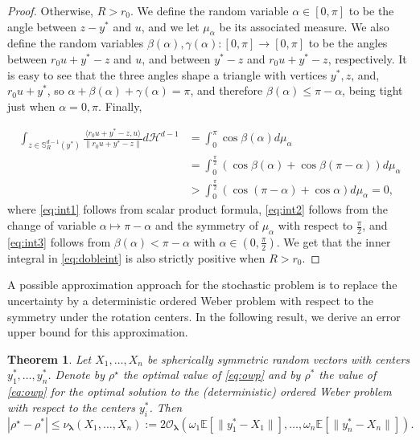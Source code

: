\documentclass[letter,11pt, reqno]{amsart}
\newcommand{\E}{\mathbb{E}}
\newcommand{\HH}{\mathcal{H}}
\renewcommand{\SS}{\mathbb{S}}
\renewcommand{\O}{\mathcal{O}}
\renewcommand{\;}{\quad}
\theoremstyle{thmstyleone}%
\newtheorem{theorem}{Theorem}%
\theoremstyle{thmstyletwo}%
\theoremstyle{thmstylethree}%
\begin{document}
\begin{proof}
    Otherwise, $R>r_0$. We define the random variable $\alpha\in[0, \pi]$ to be the angle between $z-y^*$ and $u$, and we let $\mu_\alpha$ be its associated measure. We also define the random variables $\beta(\alpha), \gamma(\alpha):[0, \pi ]\to [0, \pi ]$ to be the angles between $r_0u+y^* -z$ and $u$, and between $y^*-z$ and $r_0u+y^*-z$, respectively. It is easy to see that the three angles shape a triangle with vertices $y^*, z$, and, $r_0u+y^*$, so $\alpha+\beta(\alpha)+\gamma(\alpha)=\pi$, and therefore $\beta(\alpha)\leq \pi-\alpha$, being tight just when $\alpha=0,\pi$. Finally,

    \begin{align}
        \int_{z\in\SS^{d-1}_R(y^*)}\frac{\langle r_0u+y^*-z, u\rangle}{\|r_0u+y^*-z\|}d\HH^{d-1} & = \int_0^\pi\cos\beta(\alpha)d\mu_\alpha \label{eq:int1}\\
        &= \int_0^{\frac{\pi}{2}}(\cos\beta(\alpha)+\cos\beta(\pi-\alpha) )d\mu_\alpha\label{eq:int2}\\
        & > \int_0^{\frac{\pi}{2}}(\cos(\pi-\alpha)+\cos \alpha )d\mu_\alpha=0,\label{eq:int3}
    \end{align}
where \eqref{eq:int1} follows from scalar product formula, \eqref{eq:int2} follows from the change of variable $\alpha\mapsto \pi-\alpha$ and the symmetry of $\mu_\alpha$ with respect to $\frac{\pi}{2}$, and \eqref{eq:int3} follows from $\beta(\alpha)< \pi-\alpha$ with $\alpha\in (0,\frac{\pi}{2})$. We get that the inner integral in \eqref{eq:dobleint} is also strictly positive when $R>r_0$.
\end{proof}
A possible approximation approach for the stochastic problem is to replace the uncertainty by a deterministic ordered Weber problem with respect to the symmetry under the rotation centers. In the following result, we derive an error upper bound for this approximation.
\begin{theorem}
    Let $X_1, \ldots, X_n$ be spherically symmetric random vectors with centers $y_1^*, \ldots, y_n^*$. Denote by $\rho^\star$ the optimal value of \ref{eq:owp} and by $\rho^*$ the value of \ref{eq:owp} for the optimal solution to the (deterministic) ordered Weber problem with respect to the centers $y^*_i$. Then
    \begin{equation*}
        |\rho^\star - \rho^*| \leq \nu_{\bm{\lambda}}(X_1, \ldots,X_n) := 2 \O_{\bm \lambda}\left(\omega_1\E\left[\|y^*_1-X_1\|\right],\ldots,\omega_n\E\left[\|y^*_n-X_n\|\right]\right).
    \end{equation*}
\end{theorem}
\end{document}
